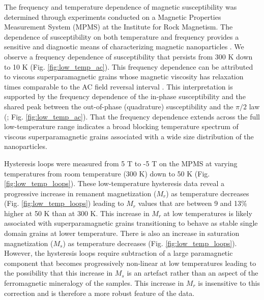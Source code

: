 \documentclass[draft]{agujournal2018}
\begin{document}
The frequency and temperature dependence of magnetic susceptibility was determined through experiments conducted on a Magnetic Properties Measurement System (MPMS) at the Institute for Rock Magnetism. The dependence of susceptibility on both temperature and frequency provides a sensitive and diagnostic means of characterizing magnetic nanoparticles \citep{Worm1999a}. We observe a frequency dependence of susceptibility that persists from 300 K down to 10 K (Fig. \ref{fig:low_temp_ac}). This frequency dependence can be attributed to viscous superparamagnetic grains whose magnetic viscosity has relaxation times comparable to the AC field reversal interval \citep{Worm1998a, Worm1999a}. This interpretation is supported by the frequency dependence of the in-phase susceptibility and the shared peak between the out-of-phase (quadrature) susceptibility and the $\pi/2$ law (\citealp{Mullins1973a}; Fig. \ref{fig:low_temp_ac}). That the frequency dependence extends across the full low-temperature range indicates a broad blocking temperature spectrum of viscous superparamagnetic grains associated with a wide size distribution of the nanoparticles. 

Hysteresis loops were measured from 5 T to -5 T on the MPMS at varying temperatures from room temperature (300 K) down to 50 K (Fig. \ref{fig:low_temp_loops}). These low-temperature hysteresis data reveal a progressive increase in remanent magnetization ($M_r$) as temperature decreases (Fig. \ref{fig:low_temp_loops}) leading to $M_r$ values that are between 9 and 13$\%$ higher at 50 K than at 300 K. This increase in $M_r$ at low temperatures is likely associated with superparamagnetic grains transitioning to behave as stable single domain grains at lower temperature. There is also an increase in saturation magnetization ($M_s$) as temperature decreases (Fig. \ref{fig:low_temp_loops}). However, the hysteresis loops require subtraction of a large paramagnetic component that becomes progressively non-linear at low temperatures leading to the possibility that this increase in $M_s$ is an artefact rather than an aspect of the ferromagnetic mineralogy of the samples. This increase in $M_r$ is insensitive to this correction and is therefore a more robust feature of the data. 
\end{document}
